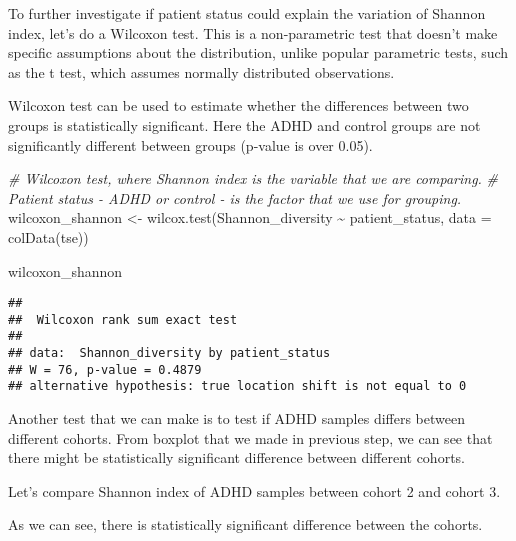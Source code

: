 \documentclass[
  oneside]{book}
\newenvironment{Shaded}{\begin{snugshade}}{\end{snugshade}}
\newcommand{\AttributeTok}[1]{\textcolor[rgb]{0.77,0.63,0.00}{#1}}
\newcommand{\CommentTok}[1]{\textcolor[rgb]{0.56,0.35,0.01}{\textit{#1}}}
\newcommand{\FunctionTok}[1]{\textcolor[rgb]{0.00,0.00,0.00}{#1}}
\newcommand{\NormalTok}[1]{#1}
\newcommand{\OtherTok}[1]{\textcolor[rgb]{0.56,0.35,0.01}{#1}}
\newcommand{\SpecialCharTok}[1]{\textcolor[rgb]{0.00,0.00,0.00}{#1}}
\begin{document}
To further investigate if patient status could explain the variation
of Shannon index, let's do a Wilcoxon test. This is a non-parametric
test that doesn't make specific assumptions about the distribution,
unlike popular parametric tests, such as the t test, which assumes
normally distributed observations.

Wilcoxon test can be used to estimate whether the differences between
two groups is statistically significant. Here the ADHD and control
groups are not significantly different between groups (p-value is over
0.05).

\begin{Shaded}
\begin{Highlighting}[]
\CommentTok{\# Wilcoxon test, where Shannon index is the variable that we are comparing. }
\CommentTok{\# Patient status {-} ADHD or control {-} is the factor that we use for grouping. }
\NormalTok{wilcoxon\_shannon }\OtherTok{\textless{}{-}} \FunctionTok{wilcox.test}\NormalTok{(Shannon\_diversity }\SpecialCharTok{\textasciitilde{}}\NormalTok{ patient\_status, }\AttributeTok{data =} \FunctionTok{colData}\NormalTok{(tse))}

\NormalTok{wilcoxon\_shannon}
\end{Highlighting}
\end{Shaded}

\begin{verbatim}
## 
##  Wilcoxon rank sum exact test
## 
## data:  Shannon_diversity by patient_status
## W = 76, p-value = 0.4879
## alternative hypothesis: true location shift is not equal to 0
\end{verbatim}

Another test that we can make is to test if ADHD samples differs between different
cohorts. From boxplot that we made in previous step, we can see that there might
be statistically significant difference between different cohorts.

Let's compare Shannon index of ADHD samples between cohort 2 and cohort 3.

As we can see, there is statistically significant difference between the cohorts.
\end{document}
